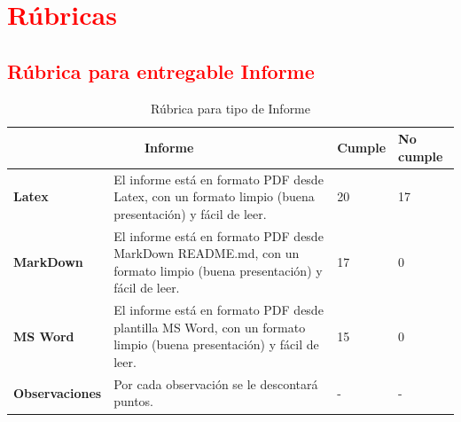\documentclass{article}
\begin{document}
	\section{\textcolor{red}{Rúbricas}}
	
\subsection{\textcolor{red}{Rúbrica para entregable Informe}}

\begin{table}[H]
    \caption{Rúbrica para tipo de Informe}
    \setlength{\tabcolsep}{0.5em} %
    {\renewcommand{\arraystretch}{1.5}%
    \begin{tabular}{|p{3cm}|p{10cm}|p{2cm}|p{2cm}|}
        \hline
        \multicolumn{2}{|c|}{\textbf{Informe}} & \textbf{Cumple} & \textbf{No cumple} \\
        \hline
        \textbf{Latex} & El informe está en formato PDF desde Latex, con un formato limpio (buena presentación) y fácil de leer. & 20 & 17 \\ 
        \hline
        \textbf{MarkDown} & El informe está en formato PDF desde MarkDown README.md, con un formato limpio (buena presentación) y fácil de leer. & 17 & 0 \\ 
        \hline
        \textbf{MS Word} & El informe está en formato PDF desde plantilla MS Word, con un formato limpio (buena presentación) y fácil de leer. & 15 & 0 \\ 
        \hline
        \textbf{Observaciones} & Por cada observación se le descontará puntos. & - & - \\
        \hline
    \end{tabular}
    }
\end{table}
\end{document}
